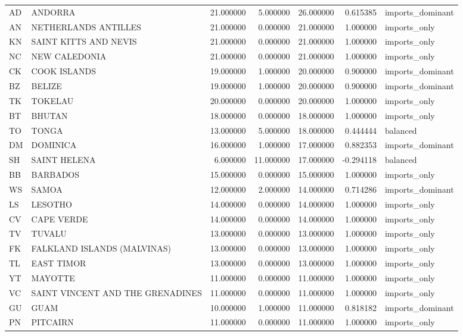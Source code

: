 \begin{tabular}{llrrrrl}
AD & ANDORRA & 21.000000 & 5.000000 & 26.000000 & 0.615385 & imports\_dominant \\
AN & NETHERLANDS ANTILLES & 21.000000 & 0.000000 & 21.000000 & 1.000000 & imports\_only \\
KN & SAINT KITTS AND NEVIS & 21.000000 & 0.000000 & 21.000000 & 1.000000 & imports\_only \\
NC & NEW CALEDONIA & 21.000000 & 0.000000 & 21.000000 & 1.000000 & imports\_only \\
CK & COOK ISLANDS & 19.000000 & 1.000000 & 20.000000 & 0.900000 & imports\_dominant \\
BZ & BELIZE & 19.000000 & 1.000000 & 20.000000 & 0.900000 & imports\_dominant \\
TK & TOKELAU & 20.000000 & 0.000000 & 20.000000 & 1.000000 & imports\_only \\
BT & BHUTAN & 18.000000 & 0.000000 & 18.000000 & 1.000000 & imports\_only \\
TO & TONGA & 13.000000 & 5.000000 & 18.000000 & 0.444444 & balanced \\
DM & DOMINICA & 16.000000 & 1.000000 & 17.000000 & 0.882353 & imports\_dominant \\
SH & SAINT HELENA & 6.000000 & 11.000000 & 17.000000 & -0.294118 & balanced \\
BB & BARBADOS & 15.000000 & 0.000000 & 15.000000 & 1.000000 & imports\_only \\
WS & SAMOA & 12.000000 & 2.000000 & 14.000000 & 0.714286 & imports\_dominant \\
LS & LESOTHO & 14.000000 & 0.000000 & 14.000000 & 1.000000 & imports\_only \\
CV & CAPE VERDE & 14.000000 & 0.000000 & 14.000000 & 1.000000 & imports\_only \\
TV & TUVALU & 13.000000 & 0.000000 & 13.000000 & 1.000000 & imports\_only \\
FK & FALKLAND ISLANDS (MALVINAS) & 13.000000 & 0.000000 & 13.000000 & 1.000000 & imports\_only \\
TL & EAST TIMOR & 13.000000 & 0.000000 & 13.000000 & 1.000000 & imports\_only \\
YT & MAYOTTE & 11.000000 & 0.000000 & 11.000000 & 1.000000 & imports\_only \\
VC & SAINT VINCENT AND THE GRENADINES & 11.000000 & 0.000000 & 11.000000 & 1.000000 & imports\_only \\
GU & GUAM & 10.000000 & 1.000000 & 11.000000 & 0.818182 & imports\_dominant \\
PN & PITCAIRN & 11.000000 & 0.000000 & 11.000000 & 1.000000 & imports\_only \\

\end{tabular}
